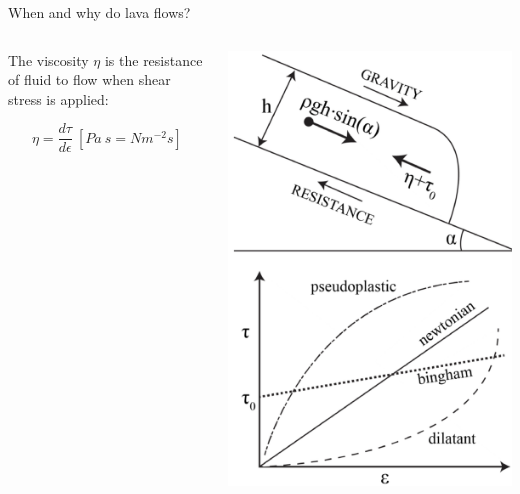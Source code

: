 \documentclass[10pt,aspectratio=169]{beamer}
\begin{document}
\begin{frame}{When and why do lava flows?}
\begin{columns}[T]
\begin{column}{0.65\textwidth}
{          The viscosity $\eta$ is the \alert{resistance of fluid} to flow when shear stress is applied:

          $$\eta = \frac{d\tau}{d\epsilon}\ [Pa\ s = Nm^{-2}          s]$$

        }


      \end{column}

      \begin{column}{0.35\textwidth}	
        \includegraphics[width=1\textwidth]{img/rheology.png}
      \end{column}
    \end{columns}

    
\end{frame}
\end{document}
